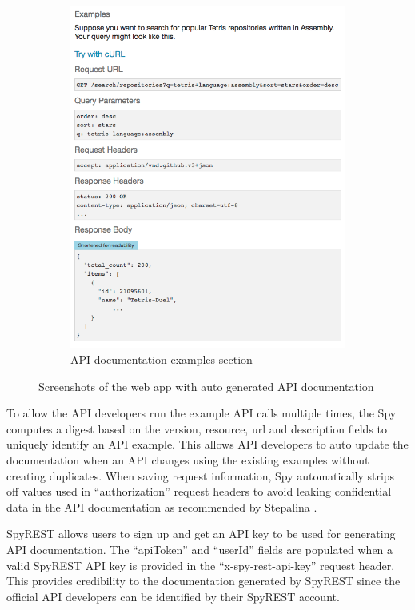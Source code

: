 \documentclass[conference]{IEEEtran}
\begin{document}
\begin{figure}[!tbh]
\begin{subfigure}[t]{0.5\textwidth}
    \includegraphics[width=\linewidth]{spyrest_examples.png}
    \caption{API documentation examples section}
    \label{fig:examples}
  \end{subfigure}
  \caption{Screenshots of the web app with auto generated API documentation}
  \label{fig:spyrest_screenshots}
\end{figure}

To allow the API developers run the example API calls multiple times, the Spy computes a digest based on the version, resource, url and description fields to uniquely identify an API example. This allows API developers to auto update the documentation when an API changes using the existing examples without creating duplicates. When saving request information, Spy automatically strips off values used in ``authorization'' request headers to avoid leaking confidential data in the API documentation as recommended by Stepalina \cite{Stepalina_saas}.

SpyREST allows users to sign up and get an API key to be used for generating API documentation. The ``apiToken'' and ``userId'' fields are populated when a valid SpyREST API key is provided in the ``x-spy-rest-api-key'' request header. This provides credibility to the documentation generated by SpyREST since the official API developers can be identified by their SpyREST account.
\end{document}
